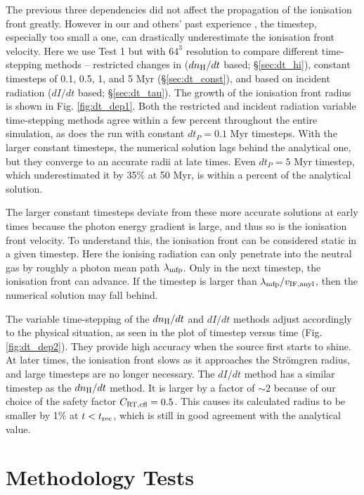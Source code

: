 \documentclass[useAMS,usenatbib]{mn2e}
\begin{document}
The previous three dependencies did not affect the propagation of the
ionisation front greatly.  However in our and others' past experience
\citep[e.g.][]{Shapiro04, Mellema06, Petkova09}, the timestep,
especially too small a one, can drastically underestimate the
ionisation front velocity.  Here we use Test 1 but with $64^3$
resolution to compare different time-stepping methods -- restricted
changes in \hii ($dn_{\rm H}/dt$ based; \S\ref{sec:dt_hi}),
constant timesteps of 0.1, 0.5, 1, and 5 Myr (\S\ref{sec:dt_const}),
and based on incident radiation ($dI/dt$ based; \S\ref{sec:dt_tau}).
The growth of the ionisation front radius is shown in Fig.
\ref{fig:dt_dep1}.  Both the \hii restricted and incident
radiation variable time-stepping methods agree within a few percent
throughout the entire simulation, as does the run with constant $dt_P
= 0.1$ Myr timesteps.  With the larger constant timesteps, the
numerical solution lags behind the analytical one, but they converge
to an accurate \hii radii at late times.  Even $dt_P = 5$ Myr
timestep, which underestimated it by 35\% at 50 Myr, is within a
percent of the analytical solution.

The larger constant timesteps deviate from these more accurate
solutions at early times because the photon energy gradient is large,
and thus so is the ionisation front velocity.  To understand this, the
ionisation front can be considered static in a given timestep.  Here
the ionising radiation can only penetrate into the neutral gas by
roughly a photon mean path $\lambda_{\rm mfp}$.  Only in the next
timestep, the ionisation front can advance.  If the timestep is larger
than $\lambda_{\rm mfp} / v_{\rm IF, anyl}$, then the numerical
solution may fall behind.

The variable time-stepping of the $dn_{\rm H}/dt$ and $dI/dt$ methods
adjust accordingly to the physical situation, as seen in the plot of
timestep versus time (Fig. \ref{fig:dt_dep2}).  They provide high
accuracy when the source first starts to shine.  At later times, the
ionisation front slows as it approaches the Str\"{o}mgren radius, and
large timesteps are no longer necessary.  The $dI/dt$ method has a
similar timestep as the $dn_{\rm H}/dt$ method.  It is larger by a
factor of $\sim 2$ because of our choice of the safety factor $C_{\rm
  RT, cfl} = 0.5$.  This causes its calculated radius to be smaller by
1\% at $t < t_{\rm rec}$, which is still in good agreement with the
analytical value.

\section{Methodology Tests}
\end{document}
